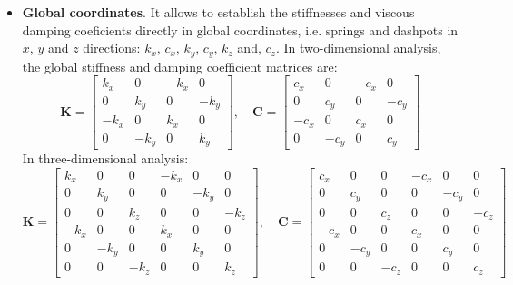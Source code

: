 \documentclass[a4paper,fleqn]{book}
\begin{document}
\begin{itemize}
    \item \textbf{Global coordinates}. It allows to establish the stiffnesses and viscous damping coeficients directly in global coordinates, i.e. springs and dashpots in $x$, $y$ and $z$ directions: $k_{x}$, $c_{x}$, $k_{y}$, $c_{y}$, $k_{z}$ and, $c_{z}$. In two-dimensional analysis, the global stiffness and damping coefficient matrices are:
    \begin{equation}
    \mathbf{K}
    =
    \left[
    \begin{array}{cccc}
    k_{x} & 0      & -k_{x} &       0 \\
    0      & k_{y} &       0 & -k_{y} \\
    -k_{x} &  0    & k_{x} &      0 \\
        0 & -k_{y} &      0 & k_{y}
    \end{array}
    \right],
    \quad
    \mathbf{C}
    =
    \left[
    \begin{array}{cccc}
    c_{x} & 0      & -c_{x} &       0 \\
    0      & c_{y} &       0 & -c_{y} \\
    -c_{x} &  0    & c_{x} &      0 \\
        0 & -c_{y} &      0 & c_{y}
    \end{array}
    \right]
    \end{equation}
    In three-dimensional analysis:
    \begin{equation}
    \mathbf{K}
    =
    \left[
    \begin{array}{cccccc}
    k_{x} & 0      & 0      & -k_{x} &       0 & 0 \\
    0      & k_{y} & 0      &       0 & -k_{y} & 0 \\
    0      & 0      & k_{z} &       0 &       0 & -k_{z} \\
    -k_{x} &       0 & 0       & k_{x} &      0 & 0 \\
        0 & -k_{y} & 0       &      0 & k_{y} & 0 \\
        0 &       0 & -k_{z} &      0 &      0 & k_{z}
    \end{array}
    \right],
    \quad
    \mathbf{C}
    =
    \left[
    \begin{array}{cccccc}
    c_{x} & 0      & 0      & -c_{x} &       0 & 0 \\
    0      & c_{y} & 0      &       0 & -c_{y} & 0 \\
    0      & 0      & c_{z} &       0 &       0 & -c_{z} \\
    -c_{x} &       0 & 0       & c_{x} &      0 & 0 \\
        0 & -c_{y} & 0       &      0 & c_{y} & 0 \\
        0 &       0 & -c_{z} &      0 &      0 & c_{z}
    \end{array}
    \right]
    \end{equation}
    
\end{itemize}
\end{document}
